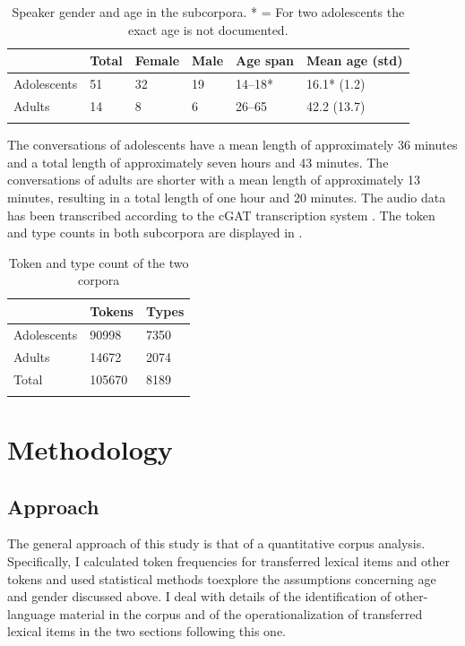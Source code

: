 \documentclass[output=paper]{langsci/langscibook}
\begin{document}
  
 \begin{table}
\begin{tabularx}{0.95\textwidth}{Xp{1.2cm}p{1.2cm}p{1cm}p{1.7cm}p{1.8cm}} 
\lsptoprule
& {Total} & {Female} & {Male} & {Age span} & {Mean age (std)}\\
\hline
{Adolescents} & {51} & {32} & {19} & {14--18*} & {16.1* (1.2)}\\
{Adults} & {14} & {8} & {6} & {26--65} & {42.2 (13.7)}\\
\lspbottomrule
\end{tabularx}
\caption{Speaker gender and age in the subcorpora. * = For two adolescents the exact age is not documented.}
\label{tab:bracke:1}
\end{table}  

The conversations of adolescents have a mean length of approximately 36 minutes and a total length of approximately seven hours and 43 minutes. The conversations of adults are shorter with a mean length of approximately 13 minutes, resulting in a total length of one hour and 20 minutes. The audio data has been transcribed according to the cGAT transcription system \citep{schmidt_cgat_2015}. The token and type counts in both subcorpora are displayed in .

  

  
 \begin{table}
\begin{tabularx}{0.5\textwidth}{XYY} 
\lsptoprule
& {Tokens} & {Types}\\
\hline
{Adolescents} & {90998} & {7350}\\
{Adults} & {14672} & {2074}\\
{Total} & {105670} & {8189}\\
\lspbottomrule
\end{tabularx}
\caption{Token and type count of the two corpora}
\label{tab:bracke:2}
\end{table}  

 
\section{Methodology}
\label{sec:bracke:4}
 
   
\subsection{Approach}
\label{sec:bracke:4.1}
The general approach of this study is that of a quantitative corpus analysis. Specifically, I calculated token frequencies for transferred lexical items and other tokens and used statistical methods toexplore the assumptions concerning age and gender discussed above. I deal with details of the identification of other-language material in the corpus and of the operationalization of transferred lexical items in the two sections following this one.
\end{document}
